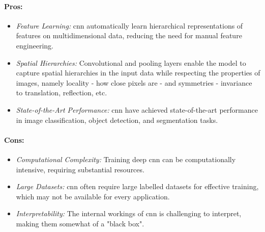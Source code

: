 \paragraph{Pros:}
\begin{itemize}
    \item \textit{Feature Learning:} \gls{cnn} automatically learn hierarchical representations of features on multidimensional data, reducing the need for manual feature engineering.
    \item \textit{Spatial Hierarchies:} Convolutional and pooling layers enable the model to capture spatial hierarchies in the input data while respecting the properties of images, namely locality - how close pixels are - and symmetries - invariance to translation, reflection, etc. 
    \item \textit{State-of-the-Art Performance:} \gls{cnn} have achieved state-of-the-art performance in image classification, object detection, and segmentation tasks.
\end{itemize}

\paragraph{Cons:}
\begin{itemize}
    \item \textit{Computational Complexity:} Training deep \gls{cnn} can be computationally intensive, requiring substantial resources.
    \item \textit{Large Datasets:} \gls{cnn} often require large labelled datasets for effective training, which may not be available for every application.
    \item \textit{Interpretability:} The internal workings of \gls{cnn} is challenging to interpret, making them somewhat of a "black box".
\end{itemize}

